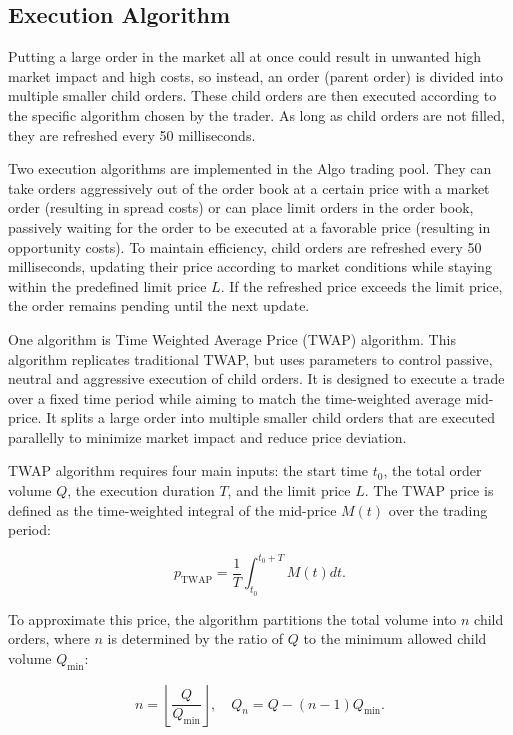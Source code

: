 \subsection{Execution Algorithm}
Putting a large order in the market all at once could result in unwanted high market impact and high costs, so instead, an order (parent order) is divided into multiple smaller child orders. These child orders are then executed according to the specific algorithm chosen by the trader. As long as child orders are not filled, they are refreshed every 50 milliseconds. 

Two execution algorithms are implemented in the Algo trading pool. They can take orders aggressively out of the order book at a certain price with a market order (resulting in spread costs) or can place limit orders in the order book, passively waiting for the order to be executed at a favorable price (resulting in opportunity costs). To maintain efficiency, child orders are refreshed every 50 milliseconds, updating their price according to market conditions while staying within the predefined limit price $L$. If the refreshed price exceeds the limit price, the order remains pending until the next update.

One algorithm is Time Weighted Average Price (TWAP) algorithm. This algorithm replicates traditional TWAP, but uses parameters to control passive, neutral and aggressive execution of child orders. It is designed to execute a trade over a fixed time period while aiming to match the time-weighted average mid-price. It splits a large order into multiple smaller child orders that are executed parallelly to minimize market impact and reduce price deviation.

TWAP algorithm requires four main inputs: the start time $t_0$, the total order volume $Q$, the execution duration $T$, and the limit price $L$. The TWAP price is defined as the time-weighted integral of the mid-price $M(t)$ over the trading period:

\begin{equation}
    p_{\text{TWAP}} = \frac{1}{T} \int_{t_0}^{t_0+T} M(t) dt.
    \label{eq: TWQP price}
\end{equation}

To approximate this price, the algorithm partitions the total volume into $n$ child orders, where $n$ is determined by the ratio of $Q$ to the minimum allowed child volume $Q_{\min}$:

\begin{equation}
    n = \left\lfloor \frac{Q}{Q_{\min}} \right\rfloor, \quad Q_n = Q - (n-1) Q_{\min}.
    \label{eq: Q_n}
\end{equation}

